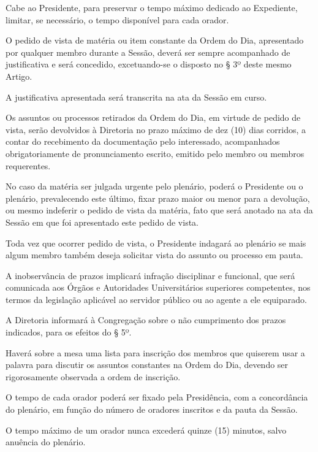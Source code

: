 \documentclass{documento}
\begin{document}
\paragrafo Cabe ao Presidente, para preservar o tempo máximo dedicado ao Expediente, limitar, se necessário, o tempo disponível para cada orador.


\artigo O pedido de vista de matéria ou item constante da Ordem do Dia, apresentado por qualquer membro durante a Sessão, deverá ser sempre acompanhado de justificativa e será concedido, excetuando-se o disposto no § 3º deste mesmo Artigo.

\paragrafo A justificativa apresentada será transcrita na ata da Sessão em curso.

\paragrafo Os assuntos ou processos retirados da Ordem do Dia, em virtude de pedido de vista, serão devolvidos à Diretoria no prazo máximo de dez (10) dias corridos, a contar do recebimento da documentação pelo interessado, acompanhados obrigatoriamente de pronunciamento escrito, emitido pelo membro ou membros requerentes.

\paragrafo No caso da matéria ser julgada urgente pelo plenário, poderá o Presidente ou o plenário, prevalecendo este último, fixar prazo maior ou menor para a devolução, ou mesmo indeferir o pedido de vista da matéria, fato que será anotado na ata da Sessão em que foi apresentado este pedido de vista.

\paragrafo Toda vez que ocorrer pedido de vista, o Presidente indagará ao plenário se mais algum membro também deseja solicitar vista do assunto ou processo em pauta.

\paragrafo A inobservância de prazos implicará infração disciplinar e funcional, que será comunicada aos Órgãos e Autoridades Universitários superiores competentes, nos termos da legislação aplicável ao servidor público ou ao agente a ele equiparado. 

\paragrafo A Diretoria informará à Congregação sobre o não cumprimento dos prazos indicados, para os efeitos do § 5º.


\artigo Haverá sobre a mesa uma lista para inscrição dos membros que quiserem usar a palavra para discutir os assuntos constantes na Ordem do Dia, devendo ser rigorosamente observada a ordem de inscrição.

\artigo O tempo de cada orador poderá ser fixado pela Presidência, com a concordância do plenário, em função do número de oradores inscritos e da pauta da Sessão.

\paragrafounico O tempo máximo de um orador nunca excederá quinze (15) minutos, salvo anuência do plenário.
\end{document}

